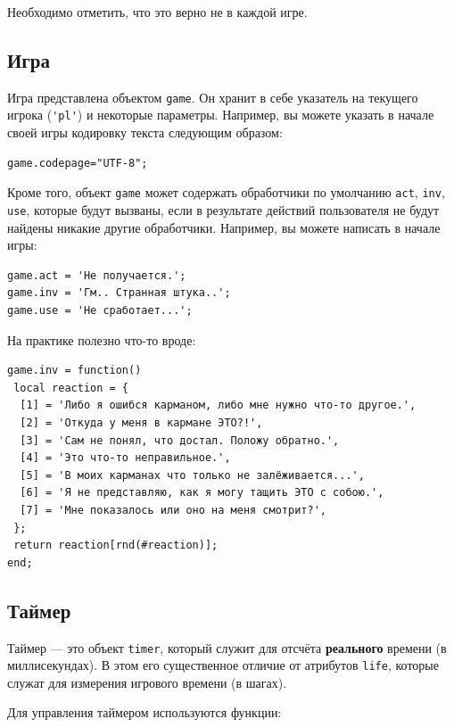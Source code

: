 \documentclass[a4paper,12pt]{article}
\begin{document}
Необходимо отметить, что это верно не в каждой игре.

\subsection{Игра}

Игра представлена объектом \verb/game/. Он хранит в себе указатель на текущего игрока (\verb/'pl'/) и некоторые параметры. Например, вы можете указать в начале своей игры кодировку текста следующим образом:

\begin{verbatim}
game.codepage="UTF-8";
\end{verbatim}

Кроме того, объект \verb/game/ может содержать обработчики по умолчанию \verb/act/, \verb/inv/, \verb/use/, которые будут вызваны, если в результате действий пользователя не будут найдены никакие другие обработчики. Например, вы можете написать в начале игры:

\begin{verbatim}
game.act = 'Не получается.';
game.inv = 'Гм.. Странная штука..';
game.use = 'Не сработает...';
\end{verbatim}

На практике полезно что-то вроде:

\begin{verbatim}
game.inv = function()
 local reaction = {
  [1] = 'Либо я ошибся карманом, либо мне нужно что-то другое.',
  [2] = 'Откуда у меня в кармане ЭТО?!',
  [3] = 'Сам не понял, что достал. Положу обратно.',
  [4] = 'Это что-то неправильное.',
  [5] = 'В моих карманах что только не залёживается...',
  [6] = 'Я не представляю, как я могу тащить ЭТО с собою.',
  [7] = 'Мне показалось или оно на меня смотрит?',
 };
 return reaction[rnd(#reaction)];
end;
\end{verbatim}

\subsection{Таймер}
\label{objects_timer}
Таймер --- это объект \verb/timer/, который служит для отсчёта \textbf{реального} времени (в миллисекундах). В этом его существенное отличие от атрибутов \verb/life/, которые служат для измерения игрового времени (в шагах).

Для управления таймером используются функции:
\end{document}
